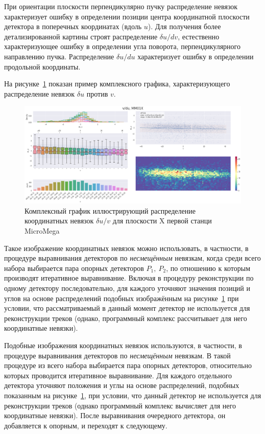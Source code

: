 При ориентации плоскости перпендикулярно пучку распределение невязок
характеризует ошибку в определении позиции центра
координатной плоскости детектора в поперечных координатах (вдоль $u$).
Для получения более детализированной картины строят
распределение $\delta u/dv$, естественно характеризующее ошибку в определении
угла поворота, перпендикулярного направлению пучка. Распределение
$\delta u/du$ характеризует ошибку в определении продольной координаты.

На рисунке~\ref{fig:residuals-example} показан пример комплексного
графика, характеризующего распределение невязок $\delta u$ против $v$.
\begin{figure}[ht]
    \centering
    \includegraphics[width=0.95\linewidth]{images/illustrative/alignment-example.png}
    \caption{Комплексный график иллюстрирующий распределение координатных
    невязок $\delta u /v$ для плоскости X первой станци MicroMega}
    \label{fig:residuals-example}
\end{figure}

Такое изображение координатных невязок можно использовать, в частности,
в процедуре выравнивания детекторов по \emph{несмещённым} невязкам, когда
среди всего набора выбирается пара опорных детекторов $P_1,~P_2$, по отношению
к которым производят итеративное выравнивание. Включая в процедуру
реконструкции по одному детектору последовательно, для каждого уточняют
значения позиций и углов на основе распределений подобных изображённым
на рисунке~\ref{fig:residuals-example} при условии, что рассматриваемый
в данный момент детектор не используется для реконструкции треков (однако,
программный комплекс рассчитывает для него координатные невязки).

Подобные изображения координатных невязок используются, в частности,
в процедуре выравнивания детекторов по \emph{несмещённым} невязкам.
В такой процедуре из всего набора выбирается пара опорных детекторов,
относительно которых проводится итеративное выравнивание.
Для каждого отдельного детектора уточняют положения и углы на основе распределений,
подобных показанным на рисунке~\ref{fig:residuals-example}, при условии,
что данный детектор не используется для реконструкции треков (однако
программный комплекс вычисляет для него координатные невязки). После
выравнивания очередного детектора, он добавляется к опорным, и переходят
к следующему.

